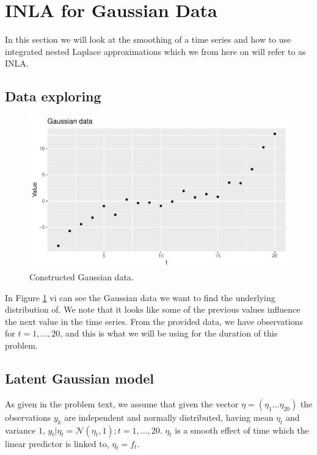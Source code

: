 \section{INLA for Gaussian Data}
In this section we will look at the smoothing of a time series and how to use integrated nested Laplace approximations which we from here on will refer to as INLA.

\subsection{Data exploring}
 
\begin{figure}[h]
    \centering
    \includegraphics[width=\textwidth]{Images/gaussian_data.pdf}
    \caption{Constructed Gaussian data.}
    \label{fig:gaussian_data}
\end{figure}

In Figure \ref{fig:gaussian_data} vi can see the Gaussian data we want to find the underlying distribution of. We note that it looks like some of the previous values influence the next value in the time series. From the provided data, we have observations for $t = 1,...,20$, and this is what we will be using for the duration of this problem. 


\subsection{Latent Gaussian model}

As given in the problem text, we assume that given the vector $\eta = (\eta_1...\eta_{20})$ the observations $y_k$ are independent and normally distributed, having mean $\eta_t$ and variance $1$,  $y_t|\eta_t = \mathcal{N}(\eta_t, 1); t = 1,...,20$. $\eta_t$ is a smooth effect of time which the linear predictor is linked to, $\eta_t = f_t$. 

